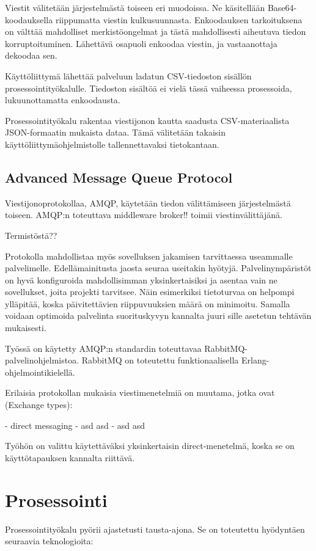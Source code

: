 \documentclass[11pt,a4paper,oneside]{memoir}
\begin{document}
Viestit välitetään järjestelmästä toiseen eri muodoissa. Ne käsitellään Base64-koodauksella riippumatta viestin kulkusuunnasta. Enkoodauksen tarkoituksena on välttää mahdolliset merkistöongelmat ja tästä mahdollisesti aiheutuva tiedon korruptoituminen. Lähettävä osapuoli enkoodaa viestin, ja vastaanottaja dekoodaa sen.

Käyttöliittymä lähettää palveluun ladatun CSV-tiedoston sisällön prosessointityökalulle. Tiedoston sisältöä ei vielä tässä vaiheessa prosessoida, lukuunottamatta enkoodausta.

Prosessointityökalu rakentaa viestijonon kautta saadusta CSV-materiaalista JSON-formaatin mukaista dataa. Tämä välitetään takaisin käyttöliittymäohjelmistolle tallennettavaksi tietokantaan. 

\subsection{Advanced Message Queue Protocol}
Viestijonoprotokollaa, AMQP, käytetään tiedon välittämiseen järjestelmästä toiseen. AMQP:n toteuttava middleware broker!! toimii viestinvälittäjänä.

Termistöstä??

Protokolla mahdollistaa myös sovelluksen jakamisen tarvittaessa useammalle palvelimelle. Edellämainitusta jaosta seuraa useitakin hyötyjä. Palvelinympäristöt on hyvä konfiguroida mahdollisimman yksinkertaisiksi ja asentaa vain ne sovellukset, joita projekti tarvitsee. Näin esimerkiksi tietoturvaa on helpompi ylläpitää, koska päivitettävien riippuvuuksien määrä on minimoitu. Samalla voidaan optimoida palvelinta suorituskyvyn kannalta juuri sille asetetun tehtävän mukaisesti.

Työssä on käytetty AMQP:n standardin toteuttavaa RabbitMQ-palvelinohjelmistoa. RabbitMQ on toteutettu funktionaalisella Erlang-ohjelmointikielellä. 

Erilaisia protokollan mukaisia viestimenetelmiä on muutama, jotka ovat (Exchange types):

- direct messaging
- asd asd
- asd asd 

Työhön on valittu käytettäväksi yksinkertaisin direct-menetelmä, koska se on käyttötapauksen kannalta riittävä.

\section{Prosessointi}
Prosessointityökalu pyörii ajastetusti tausta-ajona. Se on toteutettu hyödyntäen seuraavia teknologioita:
\end{document}
